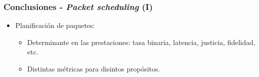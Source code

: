 \documentclass{beamer}
\begin{document}

\begin{frame}
\frametitle{Conclusiones - \textit{Packet scheduling} (I)}

\begin{itemize}
\item {
	Planificación de paquetes:
	\begin{itemize}
	\item Determinante en las prestaciones: tasa binaria, latencia, justicia, fidelidad, etc.
	\item Distintas métricas para disintos propósitos.
	\end{itemize}
}
\end{itemize}
\end{frame}
\end{document}
